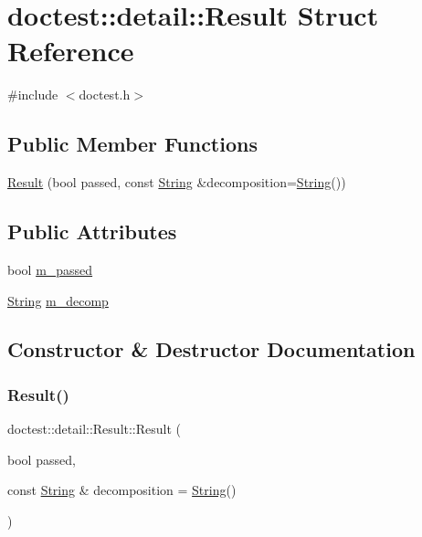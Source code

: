\hypertarget{structdoctest_1_1detail_1_1_result}{}\section{doctest\+:\+:detail\+:\+:Result Struct Reference}
\label{structdoctest_1_1detail_1_1_result}


{\ttfamily \#include $<$doctest.\+h$>$}

\subsection*{Public Member Functions}
\begin{DoxyCompactItemize}
\item 
\mbox{\hyperlink{structdoctest_1_1detail_1_1_result_ae4d2e8633aedaffa31f5c8b8530f522c}{Result}} (bool passed, const \mbox{\hyperlink{classdoctest_1_1_string}{String}} \&decomposition=\mbox{\hyperlink{classdoctest_1_1_string}{String}}())
\end{DoxyCompactItemize}
\subsection*{Public Attributes}
\begin{DoxyCompactItemize}
\item 
bool \mbox{\hyperlink{structdoctest_1_1detail_1_1_result_a03ff571186856a429ada967ddfdf3006}{m\+\_\+passed}}
\item 
\mbox{\hyperlink{classdoctest_1_1_string}{String}} \mbox{\hyperlink{structdoctest_1_1detail_1_1_result_a97968e037266580a799ab3deb9365b79}{m\+\_\+decomp}}
\end{DoxyCompactItemize}


\subsection{Constructor \& Destructor Documentation}
\mbox{\label{structdoctest_1_1detail_1_1_result_ae4d2e8633aedaffa31f5c8b8530f522c}} 
\subsubsection{\texorpdfstring{Result()}{Result()}}
{\footnotesize\ttfamily doctest\+::detail\+::\+Result\+::\+Result (\begin{DoxyParamCaption}\item[{bool}]{passed,  }\item[{const \mbox{\hyperlink{classdoctest_1_1_string}{String}} \&}]{decomposition = {\ttfamily \mbox{\hyperlink{classdoctest_1_1_string}{String}}()} }\end{DoxyParamCaption})}



